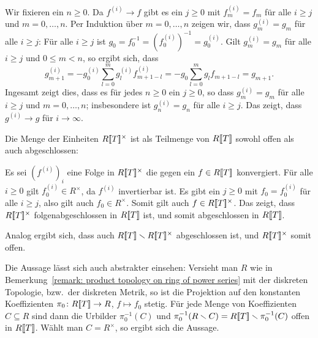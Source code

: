 \documentclass[a4paper, 10pt, numbers=noenddot]{scrartcl}
\begin{document}
Wir fixieren ein $n \geq 0$.
Da $f^{(i)} \to f$ gibt es ein $j \geq 0$ mit $f^{(i)}_m = f_m$ für alle $i \geq j$ und $m = 0, \dotsc, n$.
Per Induktion über $m = 0, \dotsc, n$ zeigen wir, dass $g^{(i)}_m = g_m$ für alle $i \geq j$:
Für alle $i \geq j$ ist $g_0 = f_0^{-1} = (f^{(i)}_0)^{-1} = g^{(i)}_0$.
Gilt $g^{(i)}_m = g_m$ für alle $i \geq j$ und $0 \leq m < n$, so ergibt sich, dass
\[    
    g^{(i)}_{m+1}
  = - g^{(i)}_0 \sum_{l=0}^m g^{(i)}_l f^{(i)}_{m+1-l}
  = - g_0 \sum_{l=0}^m g_l f_{m+1-l}
  = g_{m+1}.
\]
Ingesamt zeigt dies, dass es für jedes $n \geq 0$ ein $j \geq 0$, so dass $g^{(i)}_m = g_m$ für alle $i \geq j$ und $m = 0, \dotsc, n$;
insbesondere ist $g^{(i)}_n = g_n$ für alle $i \geq j$.
Das zeigt, dass $g^{(i)} \to g$ für $i \to \infty$.

\begin{remark}
  Die Menge der Einheiten $R[\![T]\!]^\times$ ist als Teilmenge von $R[\![T]\!]$ sowohl offen als auch abgeschlossen:
  
  Es sei $(f^{(i)})_i$ eine Folge in $R[\![T]\!]^\times$ die gegen ein $f \in R[\![T]\!]$ konvergiert.
  Für alle $i \geq 0$ gilt $f^{(i)}_0 \in R^\times$, da $f^{(i)}$ invertierbar ist.
  Es gibt ein $j \geq 0$ mit $f_0 = f^{(i)}_0$ für alle $i \geq j$, also gilt auch $f_0 \in R^\times$.
  Somit gilt auch $f \in R[\![T]\!]^\times$.
  Das zeigt, dass $R[\![T]\!]^\times$ folgenabgeschlossen in $R[\![T]\!]$ ist, und somit abgeschlossen in $R[\![T]\!]$.
  
  Analog ergibt sich, dass auch $R[\![T]\!] \smallsetminus R[\![T]\!]^\times$ abgeschlossen ist, und $R[\![T]\!]^\times$ somit offen.
  
  Die Aussage lässt sich auch abstrakter einsehen:
  Versieht man $R$ wie in Bemerkung~\ref{remark: product topology on ring of power series} mit der diskreten Topologie, bzw.\ der diskreten Metrik, so ist die Projektion auf den konstanten Koeffizienten $\pi_0 \colon R[\![T]\!] \to R$, $f \mapsto f_0$ stetig.
  Für jede Menge von Koeffizienten $C \subseteq R$ sind dann die Urbilder $\pi_0^{-1}(C)$ und $\pi_0^{-1}(R \smallsetminus C) = R[\![T]\!] \smallsetminus \pi_0^{-1}(C)$ offen in $R[\![T]\!]$.
  Wählt man $C = R^\times$, so ergibt sich die Aussage.
\end{remark}





\section{}
\end{document}
